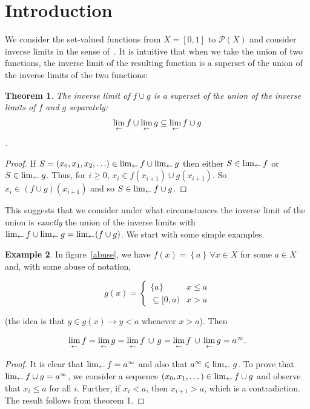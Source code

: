 \documentclass{article}
\newtheorem{thm}{Theorem}
\theoremstyle{definition}
\newtheorem{exam}[thm]{Example}
\begin{document}
\section{Introduction}

We consider the set-valued functions from $X=[0,1]$ to
$\mathcal{P}(X)$ and consider inverse limits in the sense
of~\cite{ingram2012}.  It is intuitive that when we take the union of
two functions, the inverse limit of the resulting function is a
superset of the union of the inverse limits of the two functions:

 \begin{thm}
The inverse limit of $f\cup g$ is a superset of the union of the
inverse limits of $f$ and $g$ separately: $$\lim_{\leftarrow} f \cup \lim_{\leftarrow} g
\subseteq\lim_{\leftarrow} f\cup g$$.
 \end{thm}
 \begin{proof}
If $S = (x_0, x_1, x_2, \ldots)\in\lim_{\leftarrow} f\cup\lim_{\leftarrow} g$ then
either $S\in\lim_{\leftarrow} f$ or $S\in\lim_{\leftarrow} g$.  Thus, for $i\geqslant
0$, $x_i\in f(x_{i+1})\cup g(x_{i+1})$.  So $x_i \in ( f \cup g
)(x_{i+1})$ and so $S\in\lim_{\leftarrow} f\cup g$.
 \end{proof}

This suggests that we consider under what circumstances the inverse
limit of the union is {\em exactly} the union of the inverse limits
with $\lim_{\leftarrow} f\cup\lim_{\leftarrow} g = \lim_{\leftarrow} (f\cup g)$.  We start with
some simple examples.

\begin{exam}
In figure~\ref{abuse}, we have $f(x)=\left\lbrace
a\right\rbrace\,\forall x\in X$ for some $a\in X$ and, with some abuse
of notation,

\begin{equation}
  g(x) = \begin{cases}
    \lbrace a\rbrace & x\leqslant a\\
    \subseteq[0,a) & x>a
    \end{cases}
\end{equation}

(the idea is that $y\in g(x)\longrightarrow y<a$ whenever $x>a$). Then

\begin{equation}
\lim_{\leftarrow} f = \lim_{\leftarrow} g =  \lim_{\leftarrow} f \, \cup\, g = \lim_{\leftarrow} f \,\cup\,
\lim_{\leftarrow} g = a^\infty.
\end{equation}
\end{exam}
\begin{proof}
  It is clear that $\lim_{\leftarrow} f=a^\infty$ and
  also that $a^\infty\in\lim_{\leftarrow} g$.  To prove that $\lim_{\leftarrow} f\cup g=a^\infty$,
  we consider a sequence $(x_0,x_1,\dots)\in\lim_{\leftarrow} f\cup g$ and
  observe that $x_i\leqslant a$ for all $i$.  Further, if $x_i<a$,
  then $x_{i+1}>a$, which is a contradiction.  The result follows from
  theorem 1.
\end{proof}
\end{document}
